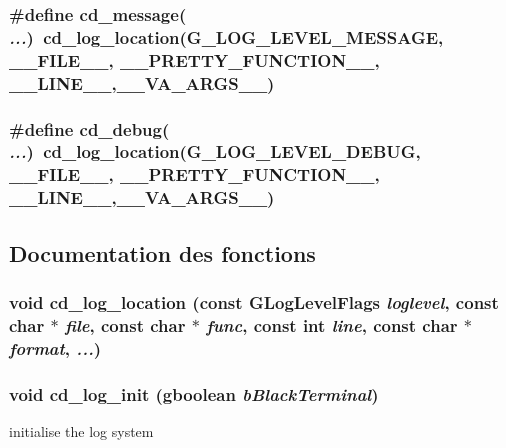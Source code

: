 \subsubsection{\setlength{\rightskip}{0pt plus 5cm}\#define cd\_\-message( {\em ...})~cd\_\-log\_\-location(G\_\-LOG\_\-LEVEL\_\-MESSAGE, \_\-\_\-FILE\_\-\_\-, \_\-\_\-PRETTY\_\-FUNCTION\_\-\_\-, \_\-\_\-LINE\_\-\_\-,\_\-\_\-VA\_\-ARGS\_\-\_\-)}\label{cairo-dock-log_8h_15e65d085780da5656e7c06097959f1c}


\subsubsection{\setlength{\rightskip}{0pt plus 5cm}\#define cd\_\-debug( {\em ...})~cd\_\-log\_\-location(G\_\-LOG\_\-LEVEL\_\-DEBUG, \_\-\_\-FILE\_\-\_\-, \_\-\_\-PRETTY\_\-FUNCTION\_\-\_\-, \_\-\_\-LINE\_\-\_\-,\_\-\_\-VA\_\-ARGS\_\-\_\-)}\label{cairo-dock-log_8h_f19c73cd7834d80ffca51238673bdea8}




\subsection{Documentation des fonctions}
\subsubsection{\setlength{\rightskip}{0pt plus 5cm}void cd\_\-log\_\-location (const GLogLevelFlags {\em loglevel}, const char $\ast$ {\em file}, const char $\ast$ {\em func}, const int {\em line}, const char $\ast$ {\em format},  {\em ...})}\label{cairo-dock-log_8h_b9da144048cfffbd5ebb0cad5c24236a}


\subsubsection{\setlength{\rightskip}{0pt plus 5cm}void cd\_\-log\_\-init (gboolean {\em bBlackTerminal})}\label{cairo-dock-log_8h_5409643f437677a7fd5579cda6b00e55}


initialise the log system 
